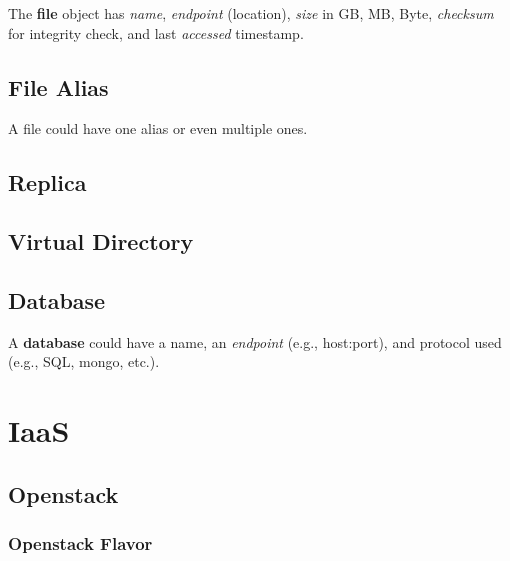 \documentclass[9pt,twocolumn,twoside]{styles/osajnl}
\begin{document}
The \textbf{file} object has \textit{name}, \textit{endpoint} (location), \textit{size}
in GB, MB, Byte, \textit{checksum} for integrity check, and last \textit{accessed} timestamp.


\subsection{File Alias}

A file could have one alias or even multiple ones.


\subsection{Replica}



\subsection{Virtual Directory}


\subsection{Database}

A \textbf{database} could have a name, an \textit{endpoint} (e.g., host:port),
and protocol used (e.g., SQL, mongo, etc.).




\section{IaaS}


\subsection{Openstack}

\subsubsection{Openstack Flavor}
\end{document}
